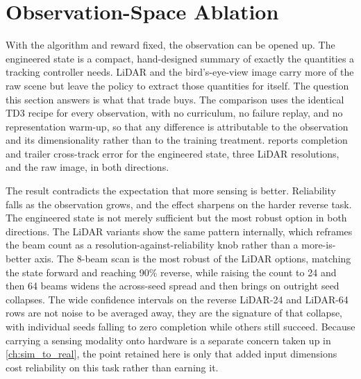 

\section{Observation-Space Ablation}
\label{sec:obs_ablation}

With the algorithm and reward fixed, the observation can be opened up. The engineered state is a compact, hand-designed summary of exactly the quantities a tracking controller needs. LiDAR and the bird's-eye-view image carry more of the raw scene but leave the policy to extract those quantities for itself. The question this section answers is what that trade buys. The comparison uses the identical TD3 recipe for every observation, with no curriculum, no failure replay, and no representation warm-up, so that any difference is attributable to the observation and its dimensionality rather than to the training treatment.  reports completion and trailer cross-track error for the engineered state, three LiDAR resolutions, and the raw image, in both directions.



The result contradicts the expectation that more sensing is better. Reliability falls as the observation grows, and the effect sharpens on the harder reverse task. The engineered state is not merely sufficient but the most robust option in both directions. The LiDAR variants show the same pattern internally, which reframes the beam count as a resolution-against-reliability knob rather than a more-is-better axis. The 8-beam scan is the most robust of the LiDAR options, matching the state forward and reaching 90\% reverse, while raising the count to 24 and then 64 beams widens the across-seed spread and then brings on outright seed collapses. The wide confidence intervals on the reverse LiDAR-24 and LiDAR-64 rows are not noise to be averaged away, they are the signature of that collapse, with individual seeds falling to zero completion while others still succeed. Because carrying a sensing modality onto hardware is a separate concern taken up in \cref{ch:sim_to_real}, the point retained here is only that added input dimensions cost reliability on this task rather than earning it.

